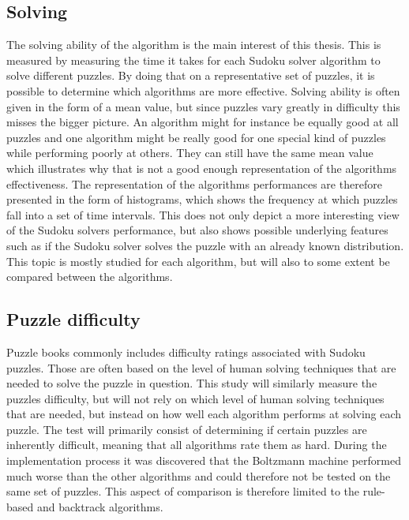 \documentclass[a4paper,11pt]{kth-mag}
\begin{document}
\FloatBarrier
\subsection{Solving}
The solving ability of the algorithm is the main interest of this thesis.
This is measured by measuring the time it takes for each Sudoku solver algorithm to solve different puzzles.
By doing that on a representative set of puzzles, it is possible to determine which algorithms are more effective.
Solving ability is often given in the form of a mean value, but since puzzles vary greatly in difficulty this misses the bigger picture.
An algorithm might for instance be equally good at all puzzles and one algorithm might be really good for one special kind of puzzles while performing poorly at others.
They can still have the same mean value which illustrates why that is not a good enough representation of the algorithms effectiveness.
The representation of the algorithms performances are therefore presented in the form of histograms, which shows the frequency at which puzzles fall into a set of time intervals.
This does not only depict a more interesting view of the Sudoku solvers performance, but also shows possible underlying features such as if the Sudoku solver solves the puzzle with an already known distribution.
This topic is mostly studied for each algorithm, but will also to some extent be compared between the algorithms.

\FloatBarrier
\subsection{Puzzle difficulty}
\label{sec:puzzleDifficulty}
Puzzle books commonly includes difficulty ratings associated with Sudoku puzzles. 
Those are often based on the level of human solving techniques that are needed to solve the puzzle in question.
This study will similarly measure the puzzles difficulty, but will not rely on which level of human solving techniques that are needed, but instead on how well each algorithm performs at solving each puzzle. 
The test will primarily consist of determining if certain puzzles are inherently difficult, meaning that all algorithms rate them as hard.
During the implementation process it was discovered that the Boltzmann machine performed much worse than the other algorithms and could therefore not be tested on the same set of puzzles.
This aspect of comparison is therefore limited to the rule-based and backtrack algorithms.

\FloatBarrier
\end{document}
